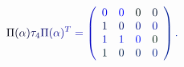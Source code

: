\documentclass[12pt]{article}
\begin{document}
\makeatletter
\renewcommand*{\@textcolor}[3]{%
  \protect\leavevmode
  \begingroup
    \color#1{#2}#3%
  \endgroup
}
\makeatother
\begin{displaymath}
\mathcolor[RGB]{0,0,15}{\Pi} \mathcolor[RGB]{0,0,30}{(} \mathcolor[RGB]{0,0,45}{\alpha} \mathcolor[RGB]{0,0,60}{)} \mathcolor[RGB]{0,0,75}{\tau} _ { \mathcolor[RGB]{0,0,90}{4} } \mathcolor[RGB]{0,0,105}{\Pi} \mathcolor[RGB]{0,0,120}{(} \mathcolor[RGB]{0,0,135}{\alpha} \mathcolor[RGB]{0,0,150}{)} ^ { \mathcolor[RGB]{0,0,165}{T} } \mathcolor[RGB]{0,0,180}{=} \mathcolor[RGB]{0,0,195}{\left(} \begin{array} {cccc} \mathcolor[RGB]{0,0,210}{\textstyle} { \mathcolor[RGB]{0,0,225}{0} } & \mathcolor[RGB]{0,0,240}{\textstyle} { \mathcolor[RGB]{0,0,255}{0} } & \mathcolor[RGB]{0,15,0}{\textstyle} { \mathcolor[RGB]{0,15,15}{0} } & \mathcolor[RGB]{0,15,30}{\textstyle} { \mathcolor[RGB]{0,15,45}{0} } \\ \mathcolor[RGB]{0,15,60}{\textstyle} { \mathcolor[RGB]{0,15,75}{1} } & \mathcolor[RGB]{0,15,90}{\textstyle} { \mathcolor[RGB]{0,15,105}{0} } & \mathcolor[RGB]{0,15,120}{\textstyle} { \mathcolor[RGB]{0,15,135}{0} } & \mathcolor[RGB]{0,15,150}{\textstyle} { \mathcolor[RGB]{0,15,165}{0} } \\ \mathcolor[RGB]{0,15,180}{\textstyle} { \mathcolor[RGB]{0,15,195}{1} } & \mathcolor[RGB]{0,15,210}{\textstyle} { \mathcolor[RGB]{0,15,225}{1} } & \mathcolor[RGB]{0,15,240}{\textstyle} { \mathcolor[RGB]{0,15,255}{0} } & \mathcolor[RGB]{0,30,0}{\textstyle} { \mathcolor[RGB]{0,30,15}{0} } \\ \mathcolor[RGB]{0,30,30}{\textstyle} { \mathcolor[RGB]{0,30,45}{1} } & \mathcolor[RGB]{0,30,60}{\textstyle} { \mathcolor[RGB]{0,30,75}{0} } & \mathcolor[RGB]{0,30,90}{\textstyle} { \mathcolor[RGB]{0,30,105}{0} } & \mathcolor[RGB]{0,30,120}{\textstyle} { \mathcolor[RGB]{0,30,135}{0} } \end{array} \mathcolor[RGB]{0,30,150}{\right)} \mathcolor[RGB]{0,30,165}{.}
\end{displaymath}
\end{document}
